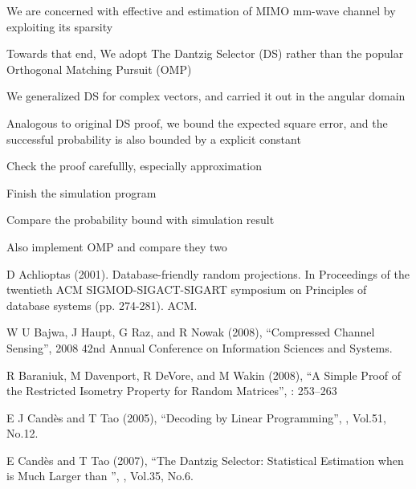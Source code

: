 {
\I We are concerned with effective and estimation of MIMO mm-wave channel by exploiting its sparsity

\I Towards that end, We adopt The Dantzig Selector (DS) rather than the popular Orthogonal Matching Pursuit (OMP)

\I We generalized DS for complex vectors, and carried it out in the angular domain

\I Analogous to original DS proof, we bound the expected square error, and the successful probability is also bounded by a explicit constant
}

\page [yes] %

{
\I Check the proof carefullly, especially approximation

\I Finish the simulation program

\I Compare the probability bound with simulation result

\I Also implement OMP and compare they two
}

\page [yes] %

{
{\tfxx
\I D Achlioptas (2001). Database-friendly random projections. In Proceedings of the twentieth ACM SIGMOD-SIGACT-SIGART symposium on Principles of database systems (pp. 274-281). ACM.

\I W U Bajwa, J Haupt, G Raz, and R Nowak (2008), ``Compressed Channel Sensing'', 2008 42nd Annual Conference on Information Sciences and Systems.

\I R Baraniuk, M Davenport, R DeVore, and M Wakin (2008), ``A Simple Proof of the Restricted Isometry Property for Random Matrices'',  : 253–263

\I E J Cand\`es and T Tao (2005), ``Decoding by Linear Programming'', , Vol.51, No.12.

\I E Cand\`es and T Tao (2007), ``The Dantzig Selector: Statistical Estimation when  is Much Larger than '', , Vol.35, No.6.
}
}

